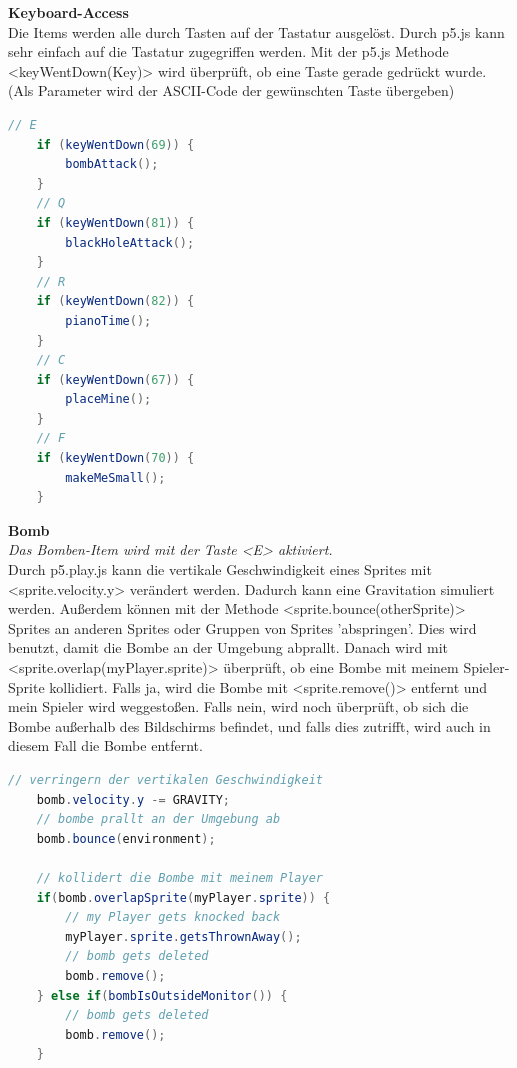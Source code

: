 \textbf{Keyboard-Access}
\\
Die Items werden alle durch Tasten auf der Tastatur ausgelöst. Durch p5.js kann sehr einfach auf die Tastatur zugegriffen werden.
Mit der p5.js Methode <keyWentDown(Key)> wird überprüft, ob eine Taste gerade gedrückt wurde. (Als Parameter wird der ASCII-Code der gewünschten Taste übergeben)

\begin{lstlisting}[caption=Keyboard-Access,language=Java,label=lst:impl:keyboard-access]
    // E
    if (keyWentDown(69)) {
        bombAttack();
    }
    // Q
    if (keyWentDown(81)) {
        blackHoleAttack();
    }
    // R
    if (keyWentDown(82)) {
        pianoTime();
    }
    // C
    if (keyWentDown(67)) {
        placeMine();
    }
    // F
    if (keyWentDown(70)) {
        makeMeSmall();
    }
\end{lstlisting}

\textbf{Bomb}
\\
\textit{Das Bomben-Item wird mit der Taste <E> aktiviert.}
\\
Durch p5.play.js kann die vertikale Geschwindigkeit eines Sprites mit <sprite.velocity.y> verändert werden. Dadurch kann eine Gravitation simuliert werden.
Außerdem können mit der Methode <sprite.bounce(otherSprite)> Sprites an anderen Sprites oder Gruppen von Sprites 'abspringen'. Dies wird benutzt, damit die Bombe an der Umgebung abprallt.
Danach wird mit <sprite.overlap(myPlayer.sprite)> überprüft, ob eine Bombe mit meinem Spieler-Sprite kollidiert.
Falls ja, wird die Bombe mit <sprite.remove()> entfernt und mein Spieler wird weggestoßen.
Falls nein, wird noch überprüft, ob sich die Bombe außerhalb des Bildschirms befindet, und falls dies zutrifft, wird auch in diesem Fall die Bombe entfernt.
\\

\begin{lstlisting}[caption=Bomb Item Physics,language=Java,label=lst:impl:bombGravity]
    // verringern der vertikalen Geschwindigkeit 
    bomb.velocity.y -= GRAVITY;
    // bombe prallt an der Umgebung ab
    bomb.bounce(environment);

    // kollidert die Bombe mit meinem Player
    if(bomb.overlapSprite(myPlayer.sprite)) {
        // my Player gets knocked back
        myPlayer.sprite.getsThrownAway();
        // bomb gets deleted
        bomb.remove();
    } else if(bombIsOutsideMonitor()) {
        // bomb gets deleted
        bomb.remove();
    }

\end{lstlisting}

